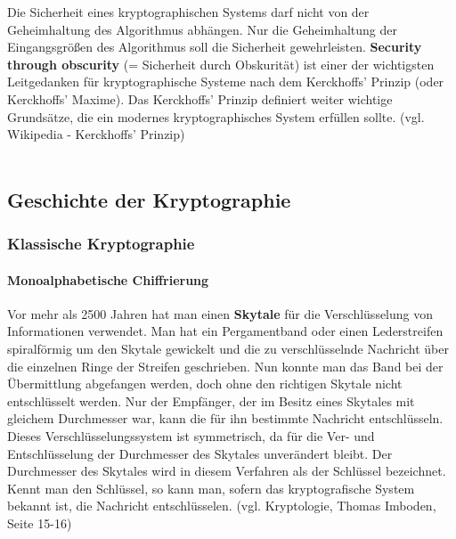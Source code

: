 \documentclass[12pt,a4paper]{report}
\begin{document}
Die Sicherheit eines kryptographischen Systems darf nicht von der Geheimhaltung des Algorithmus abhängen. Nur die Geheimhaltung der Eingangsgrößen des Algorithmus soll die Sicherheit gewehrleisten. \textbf{Security through obscurity} (= Sicherheit durch Obskurität) ist einer der wichtigsten Leitgedanken für kryptographische Systeme nach dem Kerckhoffs' Prinzip (oder Kerckhoffs' Maxime). Das Kerckhoffs' Prinzip definiert weiter wichtige Grundsätze, die ein modernes kryptographisches System erfüllen sollte. (vgl. Wikipedia - Kerckhoffs' Prinzip)\\\\

\subsection{Geschichte der Kryptographie}

\subsubsection{Klassische Kryptographie}

\paragraph{Monoalphabetische Chiffrierung}

Vor mehr als 2500 Jahren hat man einen \textbf{Skytale} für die Verschlüsselung von Informationen verwendet. Man hat ein Pergamentband oder einen Lederstreifen spiralförmig um den Skytale gewickelt und die zu verschlüsselnde Nachricht über die einzelnen Ringe der Streifen geschrieben. Nun konnte man das Band bei der Übermittlung abgefangen werden, doch ohne den richtigen Skytale nicht entschlüsselt werden. Nur der Empfänger, der im Besitz eines Skytales mit gleichem Durchmesser war, kann die für ihn bestimmte Nachricht entschlüsseln. Dieses Verschlüsselungssystem ist symmetrisch, da für die Ver- und Entschlüsselung der Durchmesser des Skytales unverändert bleibt. Der Durchmesser des Skytales wird in diesem Verfahren als der Schlüssel bezeichnet. Kennt man den Schlüssel, so kann man, sofern das kryptografische System bekannt ist, die Nachricht entschlüsselen. (vgl. Kryptologie, Thomas Imboden, Seite 15-16)\\\\
\end{document}
